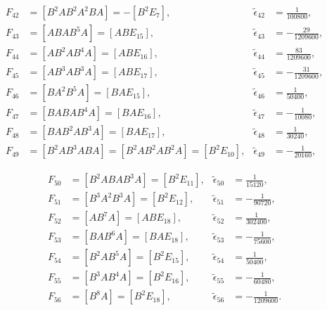 \documentclass[12pt]{article}
\begin{document}
\begin{equation}
\begin{aligned}
    F_{42} &= \left [ B^{2} A B^{2} A^{2} B A \right ] = - \left [ B^{2} E_{7} \right ], & \tilde{\epsilon}_{42} &= \frac{1}{100 800}, \\
    F_{43} &= \left [ A B A B^{5} A \right ] = \left [ A B E_{15} \right ], & \tilde{\epsilon}_{43} &= - \frac{29}{1 209 600}, \\
    F_{44} &= \left [ A B^{2} A B^{4} A \right ] = \left [ A B E_{16} \right ], & \tilde{\epsilon}_{44} &= \frac{83}{1 209 600}, \\
    F_{45} &= \left [ A B^{3} A B^{3} A \right ] = \left [ A B E_{17} \right ], & \tilde{\epsilon}_{45} &= - \frac{31}{1 209 600}, \\
    F_{46} &= \left [ B A^{2} B^{5} A \right ] = \left [ B A E_{15} \right ], & \tilde{\epsilon}_{46} &= \frac{1}{50 400}, \\
    F_{47} &= \left [ B A B A B^{4} A \right ] = \left [ B A E_{16} \right ], & \tilde{\epsilon}_{47} &= - \frac{1}{10 080}, \\
    F_{48} &= \left [ B A B^{2} A B^{3} A \right ] = \left [ B A E_{17} \right ], & \tilde{\epsilon}_{48} &= \frac{1}{30 240}, \\
    F_{49} &= \left [ B^{2} A B^{3} A B A \right ] = \left [ B^{2} A B^{2} A B^{2} A \right ] = \left [ B^{2} E_{10} \right ], & \tilde{\epsilon}_{49} &= - \frac{1}{20 160},
  \end{aligned}
\end{equation}

\begin{equation}
  \begin{aligned}
    \nonumber
    F_{50} &= \left [ B^{2} A B A B^{3} A \right ] = \left [ B^{2} E_{11} \right ], & \tilde{\epsilon}_{50} &= \frac{1}{15 120}, \\
    F_{51} &= \left [ B^{3} A^{2} B^{3} A \right ] = \left [ B^{2} E_{12} \right ], & \tilde{\epsilon}_{51} &= - \frac{1}{90 720}, \\
    F_{52} &= \left [ A B^{7} A \right ] = \left [ A B E_{18} \right ], & \tilde{\epsilon}_{52} &= \frac{1}{302 400}, \\
    F_{53} &= \left [ B A B^{6} A \right ] = \left [ B A E_{18} \right ], & \tilde{\epsilon}_{53} &= - \frac{1}{75 600}, \\
    F_{54} &= \left [ B^{2} A B^{5} A \right ] = \left [ B^{2} E_{15} \right ], & \tilde{\epsilon}_{54} &= \frac{1}{50 400}, \\
    F_{55} &= \left [ B^{3} A B^{4} A \right ] = \left [ B^{2} E_{16} \right ], & \tilde{\epsilon}_{55} &= - \frac{1}{60 480}, \\
    F_{56} &= \left [ B^{8} A \right ] = \left [ B^{2} E_{18} \right ], & \tilde{\epsilon}_{56} &= - \frac{1}{1 209 600}.
  \end{aligned}
\end{equation}
\end{document}
